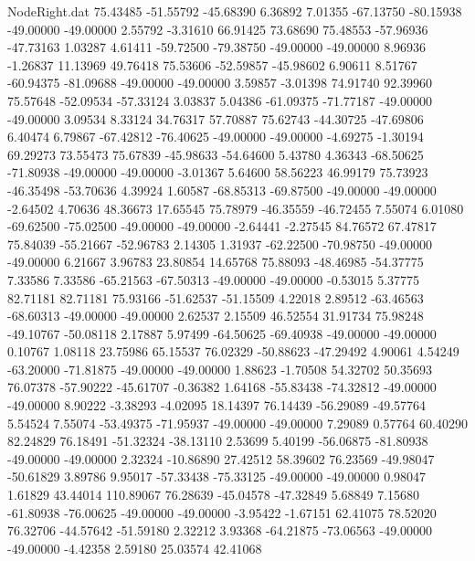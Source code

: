 \begin{filecontents}{NodeRight.dat}
  75.43485  -51.55792  -45.68390     6.36892    7.01355  -67.13750  -80.15938  -49.00000  -49.00000    2.55792   -3.31610   66.91425   73.68690
  75.48553  -57.96936  -47.73163     1.03287    4.61411  -59.72500  -79.38750  -49.00000  -49.00000    8.96936   -1.26837   11.13969   49.76418
  75.53606  -52.59857  -45.98602     6.90611    8.51767  -60.94375  -81.09688  -49.00000  -49.00000    3.59857   -3.01398   74.91740   92.39960
  75.57648  -52.09534  -57.33124     3.03837    5.04386  -61.09375  -71.77187  -49.00000  -49.00000    3.09534    8.33124   34.76317   57.70887
  75.62743  -44.30725  -47.69806     6.40474    6.79867  -67.42812  -76.40625  -49.00000  -49.00000   -4.69275   -1.30194   69.29273   73.55473
  75.67839  -45.98633  -54.64600     5.43780    4.36343  -68.50625  -71.80938  -49.00000  -49.00000   -3.01367    5.64600   58.56223   46.99179
  75.73923  -46.35498  -53.70636     4.39924    1.60587  -68.85313  -69.87500  -49.00000  -49.00000   -2.64502    4.70636   48.36673   17.65545
  75.78979  -46.35559  -46.72455     7.55074    6.01080  -69.62500  -75.02500  -49.00000  -49.00000   -2.64441   -2.27545   84.76572   67.47817
  75.84039  -55.21667  -52.96783     2.14305    1.31937  -62.22500  -70.98750  -49.00000  -49.00000    6.21667    3.96783   23.80854   14.65768
  75.88093  -48.46985  -54.37775     7.33586    7.33586  -65.21563  -67.50313  -49.00000  -49.00000   -0.53015    5.37775   82.71181   82.71181
  75.93166  -51.62537  -51.15509     4.22018    2.89512  -63.46563  -68.60313  -49.00000  -49.00000    2.62537    2.15509   46.52554   31.91734
  75.98248  -49.10767  -50.08118     2.17887    5.97499  -64.50625  -69.40938  -49.00000  -49.00000    0.10767    1.08118   23.75986   65.15537
  76.02329  -50.88623  -47.29492     4.90061    4.54249  -63.20000  -71.81875  -49.00000  -49.00000    1.88623   -1.70508   54.32702   50.35693
  76.07378  -57.90222  -45.61707    -0.36382    1.64168  -55.83438  -74.32812  -49.00000  -49.00000    8.90222   -3.38293   -4.02095   18.14397
  76.14439  -56.29089  -49.57764     5.54524    7.55074  -53.49375  -71.95937  -49.00000  -49.00000    7.29089    0.57764   60.40290   82.24829
  76.18491  -51.32324  -38.13110     2.53699    5.40199  -56.06875  -81.80938  -49.00000  -49.00000    2.32324  -10.86890   27.42512   58.39602
  76.23569  -49.98047  -50.61829     3.89786    9.95017  -57.33438  -75.33125  -49.00000  -49.00000    0.98047    1.61829   43.44014  110.89067
  76.28639  -45.04578  -47.32849     5.68849    7.15680  -61.80938  -76.00625  -49.00000  -49.00000   -3.95422   -1.67151   62.41075   78.52020
  76.32706  -44.57642  -51.59180     2.32212    3.93368  -64.21875  -73.06563  -49.00000  -49.00000   -4.42358    2.59180   25.03574   42.41068

\end{filecontents}
